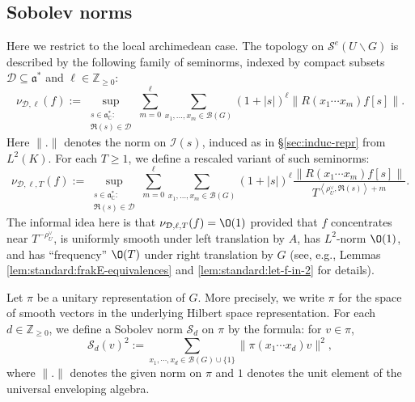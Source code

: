 \subsection{Sobolev norms}\label{sec:local-sobolev-norms-prelims}
Here we restrict to the local archimedean case.  The topology on $\mathcal{S}^e(U \backslash G)$ is described by the following family of seminorms, indexed by compact subsets $\mathcal{D} \subseteq \mathfrak{a}^*$ and $\ell \in \mathbb{Z}_{\geq 0}$:  
\begin{equation}\label{eq:nu_mathcald-ellf-:=}
  \nu_{\mathcal{D},\ell}(f) :=
  \sup_{
    \substack{
      s \in \mathfrak{a}_{\mathbb{C}}^* :  \\
      \Re(s) \in \mathcal{D}
    }
  }
  \sum_{m=0}^{\ell}
  \sum_{x_1,\dotsc,x_m \in \mathcal{B}(G)}
  (1 + |s|)^{\ell}
  \|R(x_1 \dotsb x_m) f[s] \|.
\end{equation}
Here $\|.\|$ denotes the norm on $\mathcal{I}(s)$, induced as in \S\ref{sec:induc-repr} from $L^2(K)$.  For each $T \geq 1$, we define a rescaled variant of such seminorms: 
\begin{equation*}
  \nu_{\mathcal{D},\ell,T}(f) :=
  \sup_{
    \substack{
      s \in \mathfrak{a}_{\mathbb{C}}^* :  \\
      \Re(s) \in \mathcal{D}
    }
  }
  \sum_{m=0}^{\ell}
  \sum_{x_1,\dotsc,x_m \in \mathcal{B}(G)}
  (1 + |s|)^{\ell}
  \frac{\|R(x_1 \dotsb x_m) f[s] \|}{T^{\left\langle \rho_U^\vee , \Re(s) \right\rangle + m}}.
\end{equation*}
The informal idea here is that $\nu_{\mathcal{D},\ell,T}(f) = \O(1)$ provided that $f$ concentrates near $T^{-\rho_U^\vee}$, is uniformly smooth under left translation by $A$, has $L^2$-norm $\O(1)$, and has ``frequency'' $\O(T)$ under right translation by $G$ (see, e.g., Lemmas \ref{lem:standard:frakE-equivalences} and \ref{lem:standard:let-f-in-2} for details).

Let $\pi$ be a unitary representation of $G$.  More precisely, we write $\pi$ for the space of smooth vectors in the underlying Hilbert space representation.  For each $d \in \mathbb{Z}_{\geq 0}$, we define a Sobolev norm $\mathcal{S}_d$ on $\pi$ by the formula: for $v \in \pi$,  
\begin{equation}\label{eq:mathc-:=-sum_x_1}
  \mathcal{S}_d(v)^2 := \sum_{x_1,\dotsb,x_d \in \mathcal{B}(G) \cup \{1\}} \| \pi(x_1 \dotsb x_d) v\|^2,
\end{equation}
where $\|.\|$ denotes the given norm on $\pi$ and $1$ denotes the unit element of the universal enveloping algebra.

